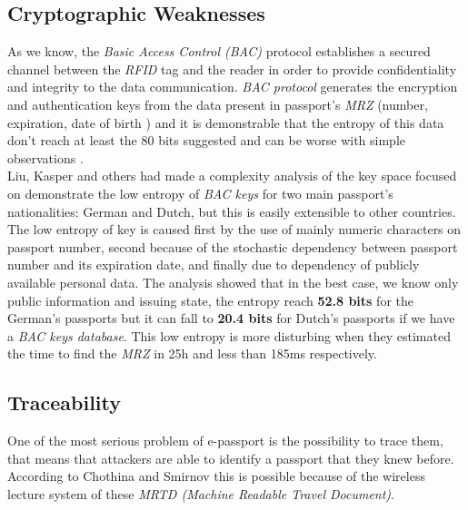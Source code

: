 \documentclass{acm_proc_article-sp}
\begin{document}
\subsection{Cryptographic Weaknesses}
\label{subsec:crypt}
As we know, the \textit{Basic Access Control (BAC)} protocol establishes a secured channel between 
the \textit{RFID} tag and the reader in order to provide confidentiality and integrity to the 
data communication. \textit{BAC protocol} generates the encryption and authentication keys from the data 
present in passport's \textit {MRZ} (number, expiration, date of birth ) and it is demonstrable 
that the entropy of this data don’t reach at least the 80 bits suggested and can be worse 
with simple observations \cite{JUAR2005} \cite{02COPA}.\\
Liu, Kasper and others \cite{02COPA} had made a complexity analysis of the key space focused on 
demonstrate the low entropy of \textit{BAC keys} for two main passport’s nationalities: German and 
Dutch, but this is easily extensible to other countries. The low entropy of key is caused 
first by the use of mainly numeric characters on passport number, 
second because of the stochastic dependency between passport number and its expiration 
date, and finally due to dependency of publicly available personal data. The analysis 
showed that in the best case, we know only public information and issuing state, the 
entropy reach \textbf {52.8 bits} for the German’s passports but it can fall to \textbf {20.4 bits} for 
Dutch's passports if we have a \textit{BAC keys database}. This low entropy is more disturbing 
when they estimated the time to find the \textit{MRZ} in 25h and less than 185ms 
respectively.

\subsection{Traceability}
\label{subsec:trace}

One of the most serious problem of e-passport is the possibility to trace them, that means that  
attackers are able to identify a passport that they knew before. According to Chothina and Smirnov 
\cite{CHTOM2010} this is possible because of the wireless lecture system of these 
\textit{MRTD (Machine Readable Travel Document)}.
\end{document}
